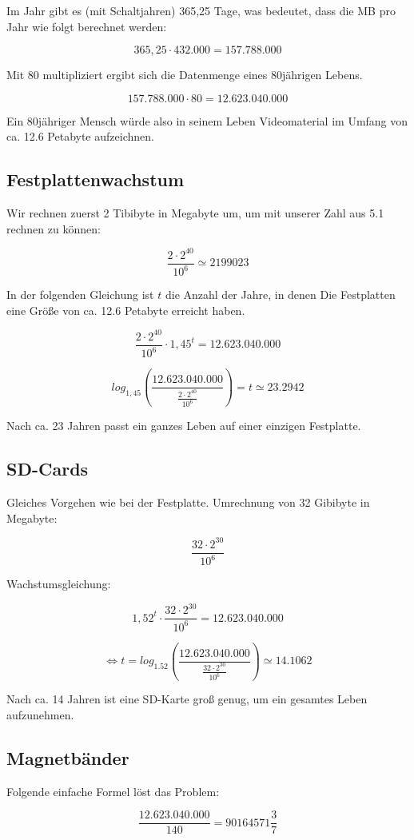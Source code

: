 \documentclass{article}
\begin{document}
	Im Jahr gibt es (mit Schaltjahren) 365,25 Tage, was bedeutet, dass die MB pro Jahr wie folgt berechnet werden:

	\[ 365,25 \cdot 432.000 = 157.788.000 \]

	Mit 80 multipliziert ergibt sich die Datenmenge eines 80jährigen Lebens.

	\[ 157.788.000 \cdot 80 = 12.623.040.000 \]

	Ein 80jähriger Mensch würde also in seinem Leben Videomaterial im Umfang von ca. 12.6 Petabyte aufzeichnen.

	\subsection{Festplattenwachstum}
	Wir rechnen zuerst 2 Tibibyte in Megabyte um, um mit unserer Zahl aus 5.1 rechnen zu können:

	\[ \frac{2 \cdot 2^{40}}{10^6} \simeq 2199023 \]

	In der folgenden Gleichung ist \(t\) die Anzahl der Jahre, in denen Die Festplatten eine Größe von ca. 12.6 Petabyte erreicht haben.

	\[ \frac{2 \cdot 2^{40}}{10^6} \cdot 1,45^t = 12.623.040.000\]

	\[ log_{1,45}(\frac{12.623.040.000}{\frac{2 \cdot 2^{40}}{10^6}}) = t \simeq 23.2942 \]

	Nach ca. 23 Jahren passt ein ganzes Leben auf einer einzigen Festplatte.

\subsection{SD-Cards}
	Gleiches Vorgehen wie bei der Festplatte. Umrechnung von 32 Gibibyte in Megabyte:

	\[ \frac{32 \cdot 2^{30}}{10^6}\]

	Wachstumsgleichung:

	\[ 1,52^t \cdot \frac{32 \cdot 2^{30}}{10^6} =  12.623.040.000 \]

	\[\Leftrightarrow t =  log_{1.52}(\frac{12.623.040.000}{\frac{32 \cdot 2^{30}}{10^6}}) \simeq 14.1062 \]

	Nach ca. 14 Jahren ist eine SD-Karte groß genug, um ein gesamtes Leben aufzunehmen.

\subsection{Magnetbänder}
	Folgende einfache Formel löst das Problem:

	\[ \frac{12.623.040.000}{140} = 90164571\frac{3}{7} \]
\end{document}
